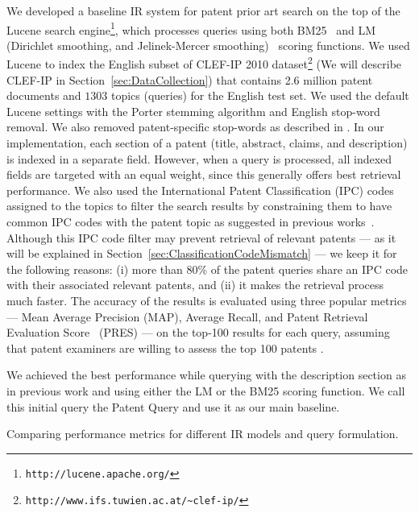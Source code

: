 We developed a baseline IR system for patent prior art search on the top of
the Lucene search engine\footnote{\texttt{http://lucene.apache.org/}}, which processes queries using both BM25~\citep{Robertson1993} and LM (Dirichlet
smoothing, and Jelinek-Mercer smoothing)~\citep{zhai2004study} scoring functions. %
We used Lucene to index the English subset of CLEF-IP 2010 dataset\footnote{\texttt{http://www.ifs.tuwien.ac.at/\textasciitilde{}clef-ip/}} 
(We will describe CLEF-IP in Section~\ref{sec:DataCollection}) that contains 2.6 million patent documents and $1303$ topics (queries) for the English test set.
We used the default Lucene settings with the Porter stemming algorithm \cite{Porter1980} and English stop-word removal. 
We also removed patent-specific stop-words as described in \cite{magdy2012toward}.
In
our implementation, each section of a patent (title, abstract, claims,
and description) is indexed in a separate field. However, when a query 
is processed, all indexed fields are targeted with an equal weight, since this generally
offers best retrieval performance. We also used the International
Patent Classification (IPC) codes assigned to the topics to filter
the search results by constraining them to have common IPC codes with
the patent topic as suggested in previous works~\citep{lopez2010patatras}.
Although this IPC code filter may prevent retrieval of relevant patents 
--- as it will be explained in Section~\ref{sec:ClassificationCodeMismatch} --- we
keep it for the following reasons: (i) more than 80\%
of the patent queries share an IPC code with their associated relevant
patents, and (ii) it makes the retrieval process much faster. The accuracy of the results is evaluated 
using three popular metrics --- Mean Average Precision (MAP), Average Recall, and Patent Retrieval Evaluation 
Score~\citep{magdy2012toward} (PRES) --- on the top-100 results for each query, assuming that patent examiners 
are willing to assess the top 100 patents \citep{joho2010survey}. 

We achieved the best performance while querying with the description
section as in previous work \citep{xue2009transforming} and using
either the LM or the BM25 scoring function. 
We call this initial 
query the Patent Query and use it as our main baseline.
\begin{savenotes}
\begin{table*}[t!]
  \begin{center}
  \caption{Comparing performance metrics for different IR models and query formulation.}
   
  \label{tab:IRmodels_Sections}
  \end{center}  
\end{table*}
\end{savenotes}

